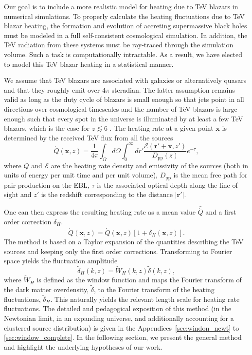 \documentclass[numberedappendix]{emulateapj}
\begin{document}
Our goal is to include a more realistic model for heating due to TeV blazars in numerical simulations.
To properly calculate the heating fluctuations due to TeV blazar heating, the formation and evolution of accreting supermassive black holes must be modeled in a full self-consistent cosmological simulation. In addition, the TeV radiation from these systems must be ray-traced through the simulation volume. Such a task is computationally intractable. As a result, we have elected to model this TeV blazar heating in a statistical manner.

We assume that TeV blazars are associated with galaxies or alternatively quasars and that they roughly emit over $4\pi$ steradian. The latter assumption remains valid as long as the duty cycle of blazars is small enough so that jets point in all directions over cosmological timescales and the number of TeV blazars is large enough such that every spot in the universe is illuminated by at least a few TeV blazars, which is the case for $z\lesssim 6$ \citep{2012ApJ...752...23C}.
The heating rate at a given point $\mathbf{x}$ is determined by the received TeV flux from all the sources 
\begin{equation}
\label{eq:heating_rate}
\dot{Q}(\mathbf{x},z)= \frac{1}{4\pi} \int_{\Omega} d\Omega\int_0^{\infty} dr'\frac{\mathcal{E}(\mathbf{r}'+\mathbf{x},z')}{D_{\mathrm{pp}}(z)} e^{-\tau},
\end{equation}
where $\dot{Q}$ and $\mathcal{E}$ are the heating rate density and emissivity of the sources (both in units of energy per unit time and per unit volume), $D_{\mathrm{pp}}$ is the mean free path for pair production on the EBL, $\tau$ is the associated optical depth along the line of sight and $z'$ is the redshift corresponding to the distance $|\mathbf{r}'|$.

One can then express the resulting heating rate as a mean value $\bar{\dot{Q}}$ and a first order correction $\delta_H$.
\begin{equation}
\label{eq:delta_h}
\dot{Q}(\mathbf{x},z)=\bar{\dot{Q}}(\mathbf{x},z)\left[1+\delta_H(\mathbf{x},z)\right].
\end{equation}
The method is based on a Taylor expansion of the quantities describing the TeV sources and keeping only the first order corrections. Transforming to Fourier space yields the fluctuation amplitude
\begin{equation}
\label{eq:use_window}
\tilde{\delta}_H(k,z)=\tilde{W}_H(k,z)\tilde{\delta}(k,z),
\end{equation}
where $\tilde{W}_H$ is defined as the window function and maps the Fourier transform of the dark matter overdensity, $\tilde{\delta}$, to the Fourier transform of the heating fluctuations, $\tilde{\delta}_H$. This naturally yields the relevant length scale for heating rate fluctuations. The detailed and pedagogical exposition of this method (in the Newtonian limit, in an expanding universe, and additionally accounting for a clustered source distribution) is given in the Appendices~\ref{sec:windon_newt} to \ref{sec:window_complete}. In the following section, we present the general method and highlight the underlying hypotheses of our work.
\end{document}
